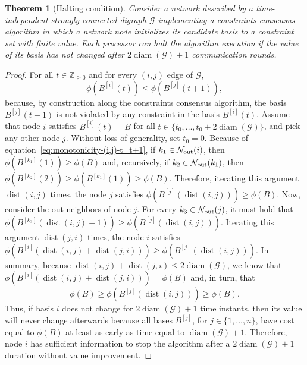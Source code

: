 \documentclass[onecolumn,journal,letterpaper]{IEEEtran}
\newcommand{\integernonnegative}{{\mathbb{Z}_{\geq0}}}
\newcommand{\naturalzero}{\mathbb{N}_0}
\renewcommand{\naturalzero}{\integernonnegative}
\newcommand{\subscr}[2]{{#1}_{\textup{#2}}}
\newcommand{\diam}{\operatorname{diam}}
\newcommand{\GG}{\mathcal{G}}
\newcommand{\until}[1]{\{1,\dots,#1\}}
\newcommand{\fromto}[2]{\{#1,\dots,#2\}}
\newcommand{\outnbrs}{\subscr{\mathcal{N}}{out}}
\newcommand{\dist}{\operatorname{dist}}
\newcommand{\supind}[2]{{#1}^{[#2]}}
\newtheorem{theorem}{Theorem}[section]
\begin{document}
\begin{theorem}[Halting condition]
  \label{thm:halting-condition}
  Consider a network described by a time-independent strongly-connected
  digraph $\GG$ implementing a constraints consensus algorithm in which a
  network node initializes its candidate basis to a constraint set with
  finite value. Each processor can halt the algorithm execution if the
  value of its basis has not changed after $2\diam(\GG)+1$ communication
  rounds.
\end{theorem}
\begin{proof}
  For all $t\in\naturalzero$ and for every $(i,j)$ edge of $\GG$,
  \begin{equation}
    \label{eq:monotonicity-(i,j)-t_t+1}
    \phi(\supind{B}{i}(t)) \leq \phi(\supind{B}{j}(t+1)),
  \end{equation}
  because, by construction along the constraints consensus algorithm, the
  basis $\supind{B}{j}(t+1)$ is not violated by any constraint in the basis
  $\supind{B}{i}(t)$.  Assume that node $i$ satisfies $\supind{B}{i}(t) =
  B$ for all $t \in \fromto{t_0}{t_0+2\diam(\GG)}$, and pick any other node
  $j$. Without loss of generality, set $t_0=0$. Because of
  equation~\eqref{eq:monotonicity-(i,j)-t_t+1}, if $k_1\in\outnbrs(i)$,
  then $\phi(\supind{B}{k_1}(1)) \geq \phi(B)$ and, recursively, if
  $k_2\in\outnbrs(k_1)$, then $\phi(\supind{B}{k_2}(2)) \geq
  \phi(\supind{B}{k_1}(1)) \geq \phi(B)$.  Therefore, iterating this
  argument $\dist(i,j)$ times, the node $j$ satisfies
  $\phi(\supind{B}{j}(\dist(i,j))) \geq \phi(B)$.  Now, consider the
  out-neighbors of node $j$.  For every $k_3\in\outnbrs(j)$, it must hold
  that $\phi(\supind{B}{k_3}(\dist(i,j)+1)) \geq
  \phi(\supind{B}{j}(\dist(i,j)))$.  Iterating this argument $\dist(j,i)$
  times, the node $i$ satisfies $\phi(\supind{B}{i}(\dist(i,j)+\dist(j,i)))
  \geq \phi(\supind{B}{j}(\dist(i,j)))$.  In summary, because
  $\dist(i,j)+\dist(j,i)\leq 2\diam(\GG)$, we know that
  $\phi(\supind{B}{i}(\dist(i,j)+\dist(j,i)))=\phi(B)$ and, in turn, that
  \begin{equation*}
    \phi(B) \geq \phi(\supind{B}{j}(\dist(i,j))) \geq \phi(B).
  \end{equation*}
  Thus, if basis $i$ does not change for $2\diam(\GG)+1$ time instants,
  then its value will never change afterwards because all bases
  $\supind{B}{j}$, for $j\in\until{n}$, have cost equal to $\phi(B)$ at
  least as early as time equal to $\diam(\GG)+1$. Therefore, node $i$ has
  sufficient information to stop the algorithm after a $2\diam(\GG)+1$
  duration without value improvement.
\end{proof}
\end{document}
